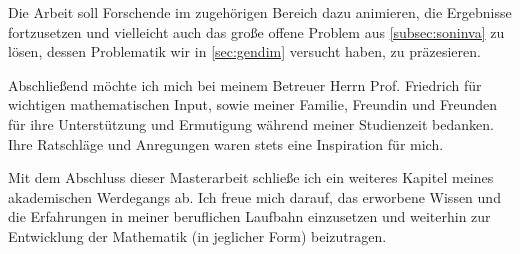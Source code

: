 Die Arbeit soll Forschende im zugehörigen Bereich dazu animieren, die Ergebnisse fortzusetzen und vielleicht auch das große offene Problem aus \ref{subsec:soninva} zu lösen, dessen Problematik wir in \ref{sec:gendim} versucht haben, zu präzesieren.

Abschließend möchte ich mich bei meinem Betreuer Herrn Prof. Friedrich für wichtigen mathematischen Input, sowie meiner Familie, Freundin und Freunden für ihre Unterstützung und Ermutigung während meiner Studienzeit bedanken. Ihre Ratschläge und Anregungen waren stets eine Inspiration für mich.

Mit dem Abschluss dieser Masterarbeit schließe ich ein weiteres Kapitel meines akademischen Werdegangs ab. Ich freue mich darauf, das erworbene Wissen und die Erfahrungen in meiner beruflichen Laufbahn einzusetzen und weiterhin zur Entwicklung der Mathematik (in jeglicher Form) beizutragen.